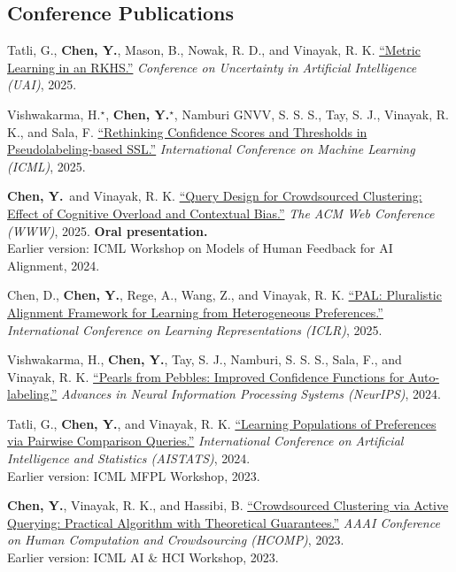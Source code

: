 \documentclass[11pt,letterpaper]{article}
\newcommand{\me}{\textbf{Chen, Y.}}
\newcommand{\earlier}[1]{\\{\small Earlier version: #1}}
\begin{document}
\subsection*{Conference Publications}
\begin{pubs}[resume]
\item Tatli, G., \me, Mason, B., Nowak, R. D., and Vinayak, R. K.
\href{https://proceedings.mlr.press/v286/tatli25a.html}{``Metric Learning in an RKHS.''}
\textit{Conference on Uncertainty in Artificial Intelligence (UAI)}, 2025.

\item Vishwakarma, H.$^\star$, \me$^\star$, Namburi GNVV, S. S. S., Tay, S. J., Vinayak, R. K., and Sala, F.
\href{https://proceedings.mlr.press/v267/vishwakarma25a.html}{``Rethinking Confidence Scores and Thresholds in Pseudolabeling-based SSL.''}
\textit{International Conference on Machine Learning (ICML)}, 2025.

\item \me\ and Vinayak, R. K.
\href{https://doi.org/10.1145/3696410.3714587}{``Query Design for Crowdsourced Clustering: Effect of Cognitive Overload and Contextual Bias.''}
\textit{The ACM Web Conference (WWW)}, 2025. \textbf{Oral presentation.}
\earlier{ICML Workshop on Models of Human Feedback for AI Alignment, 2024.}

\item Chen, D., \me, Rege, A., Wang, Z., and Vinayak, R. K.
\href{https://openreview.net/forum?id=1kFDrYCuSu}{``PAL: Pluralistic Alignment Framework for Learning from Heterogeneous Preferences.''}
\textit{International Conference on Learning Representations (ICLR)}, 2025.

\item Vishwakarma, H., \me, Tay, S. J., Namburi, S. S. S., Sala, F., and Vinayak, R. K.
\href{https://proceedings.neurips.cc/paper_files/paper/2024/hash/1d051fb631f104cb2a621451f37676b9-Abstract-Conference.html}{``Pearls from Pebbles: Improved Confidence Functions for Auto-labeling.''}
\textit{Advances in Neural Information Processing Systems (NeurIPS)}, 2024.

\item Tatli, G., \me, and Vinayak, R. K.
\href{https://proceedings.mlr.press/v238/tatli24a.html}{``Learning Populations of Preferences via Pairwise Comparison Queries.''}
\textit{International Conference on Artificial Intelligence and Statistics (AISTATS)}, 2024.
\earlier{ICML MFPL Workshop, 2023.}

\item \me, Vinayak, R. K., and Hassibi, B.
\href{https://doi.org/10.1609/hcomp.v11i1.27545}{``Crowdsourced Clustering via Active Querying: Practical Algorithm with Theoretical Guarantees.''}
\textit{AAAI Conference on Human Computation and Crowdsourcing (HCOMP)}, 2023.
\earlier{ICML AI \& HCI Workshop, 2023.}
\end{pubs}
\end{document}
